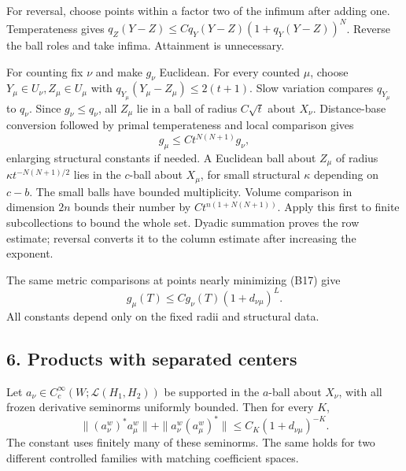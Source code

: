 \documentclass[
  11pt,
]{article}
\begin{document}
For reversal, choose points within a factor two of the infimum after
adding one. Temperateness gives \(q_Z(Y-Z)\le Cq_Y(Y-Z)(1+q_Y(Y-Z))^N\).
Reverse the ball roles and take infima. Attainment is unnecessary.

For counting fix \(\nu\) and make \(g_\nu\) Euclidean. For every counted
\(\mu\), choose \(Y_\mu\in U_\nu,Z_\mu\in U_\mu\) with
\(q_{Y_\mu}(Y_\mu-Z_\mu)\le2(t+1)\). Slow variation compares
\(q_{Y_\mu}\) to \(q_\nu\). Since \(g_\nu\le q_\nu\), all \(Z_\mu\) lie
in a ball of radius \(C\sqrt t\) about \(X_\nu\). Distance-base
conversion followed by primal temperateness and local comparison gives
\[
 g_\mu\le Ct^{N(N+1)}g_\nu,
 \tag{B19}
\] enlarging structural constants if needed. A Euclidean ball about
\(Z_\mu\) of radius \(\kappa t^{-N(N+1)/2}\) lies in the \(c\)-ball
about \(X_\mu\), for small structural \(\kappa\) depending on \(c-b\).
The small balls have bounded multiplicity. Volume comparison in
dimension \(2n\) bounds their number by \(Ct^{n(1+N(N+1))}\). Apply this
first to finite subcollections to bound the whole set. Dyadic summation
proves the row estimate; reversal converts it to the column estimate
after increasing the exponent.

The same metric comparisons at points nearly minimizing (B17) give \[
 g_\mu(T)\le Cg_\nu(T)(1+d_{\nu\mu})^L.
 \tag{B20}
\] All constants depend only on the fixed radii and structural data.

\subsection{6. Products with separated
centers}\label{products-with-separated-centers}

Let \(a_\nu\in C_c^\infty(W;\mathcal L(H_1,H_2))\) be supported in the
\(a\)-ball about \(X_\nu\), with all frozen derivative seminorms
uniformly bounded. Then for every \(K\), \[
 \|(a_\nu^w)^*a_\mu^w\|+\|a_\nu^w(a_\mu^w)^*\|
 \le C_K(1+d_{\nu\mu})^{-K}.
 \tag{B21}
\] The constant uses finitely many of these seminorms. The same holds
for two different controlled families with matching coefficient spaces.
\end{document}
